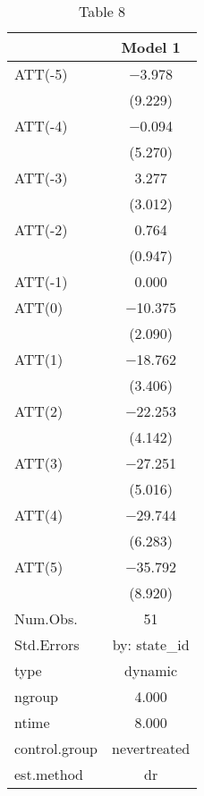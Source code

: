 \begin{table}

\caption{\label{tab:unnamed-chunk-1}Table 8}
\centering
\begin{tabular}[t]{lc}
\toprule
  & Model 1\\
\midrule
ATT(-5) & \num{-3.978}\\
 & (\num{9.229})\\
ATT(-4) & \num{-0.094}\\
 & (\num{5.270})\\
ATT(-3) & \num{3.277}\\
 & (\num{3.012})\\
ATT(-2) & \num{0.764}\\
 & (\num{0.947})\\
ATT(-1) & \num{0.000}\\
ATT(0) & \num{-10.375}\\
 & (\num{2.090})\\
ATT(1) & \num{-18.762}\\
 & (\num{3.406})\\
ATT(2) & \num{-22.253}\\
 & (\num{4.142})\\
ATT(3) & \num{-27.251}\\
 & (\num{5.016})\\
ATT(4) & \num{-29.744}\\
 & (\num{6.283})\\
ATT(5) & \num{-35.792}\\
 & (\num{8.920})\\
\midrule
Num.Obs. & \num{51}\\
Std.Errors & by: state\_id\\
type & dynamic\\
ngroup & \num{4.000}\\
ntime & \num{8.000}\\
control.group & nevertreated\\
est.method & dr\\
\bottomrule
\end{tabular}
\end{table}
